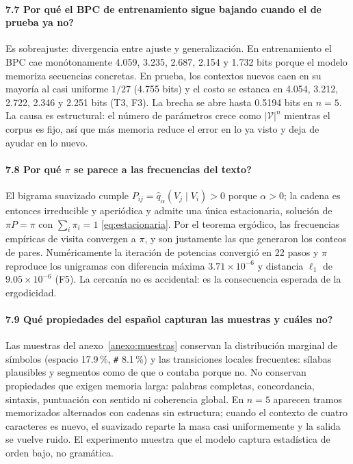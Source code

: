 \documentclass[11pt,letterpaper]{article}
\begin{document}
\paragraph{7.7 \textquestiondown{}Por qué el BPC de entrenamiento sigue bajando cuando el de prueba ya no?}
Es sobreajuste: divergencia entre ajuste y generalización. En entrenamiento el BPC cae monótonamente 4.059, 3.235, 2.687, 2.154 y 1.732 bits porque el modelo memoriza secuencias concretas. En prueba, los contextos nuevos caen en su mayoría al casi uniforme $1/27$ (4.755 bits) y el costo se estanca en 4.054, 3.212, 2.722, 2.346 y 2.251 bits (T3, F3). La brecha se abre hasta 0.5194 bits en $n=5$. La causa es estructural: el número de parámetros crece como $|\mathcal{V}|^{n}$ mientras el corpus es fijo, así que más memoria reduce el error en lo ya visto y deja de ayudar en lo nuevo.

\paragraph{7.8 \textquestiondown{}Por qué $\pi$ se parece a las frecuencias del texto?}
El bigrama suavizado cumple $P_{ij}=\hat q_\alpha(V_j\mid V_i)>0$ porque $\alpha>0$; la cadena es entonces irreducible y aperiódica y admite una única estacionaria, solución de $\pi P=\pi$ con $\sum_i\pi_i=1$ \eqref{eq:estacionaria}. Por el teorema ergódico, las frecuencias empíricas de visita convergen a $\pi$, y son justamente las que generaron los conteos de pares. Numéricamente la iteración de potencias convergió en 22 pasos y $\pi$ reproduce los unigramas con diferencia máxima $3.71\times10^{-6}$ y distancia $\ell_1$ de $9.05\times10^{-6}$ (F5). La cercanía no es accidental: es la consecuencia esperada de la ergodicidad.

\paragraph{7.9 \textquestiondown{}Qué propiedades del español capturan las muestras y cuáles no?}
Las muestras del anexo~\ref{anexo:muestras} conservan la distribución marginal de símbolos (espacio 17.9\,\%, \texttt{\#} 8.1\,\%) y las transiciones locales frecuentes: sílabas plausibles y segmentos como \guillemotleft{}de que\guillemotright{} o \guillemotleft{}contaba porque no\guillemotright{}. No conservan propiedades que exigen memoria larga: palabras completas, concordancia, sintaxis, puntuación con sentido ni coherencia global. En $n=5$ aparecen tramos memorizados alternados con cadenas sin estructura; cuando el contexto de cuatro caracteres es nuevo, el suavizado reparte la masa casi uniformemente y la salida se vuelve ruido. El experimento muestra que el modelo captura estadística de orden bajo, no gramática.
\end{document}
